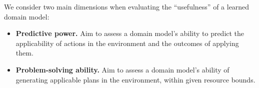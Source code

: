 \documentclass[letterpaper]{article} %
\newif\ifaddcomments
\newcommand{\roni}[1]{\ifaddcomments{\textcolor{red}{[Roni: #1]}}\fi}
\newcommand{\mauro}[1]{\ifaddcomments{\textcolor{green}{[Mauro: #1]}}\fi}
\newcommand{\gregor}[1]{\ifaddcomments{\textcolor{orange}{[Gregor: #1]}}\fi}
\begin{document}
We consider two main dimensions when evaluating the ``usefulness'' of a learned domain model: 
%
\begin{itemize}
    \item \textbf{Predictive power.} Aim to assess a domain model's ability to predict the applicability of actions in the environment and the outcomes of applying them. 
    \item \textbf{Problem-solving ability.} Aim to assess a domain model's ability of generating applicable plans in the environment, within given resource bounds. %
\end{itemize}
\end{document}
